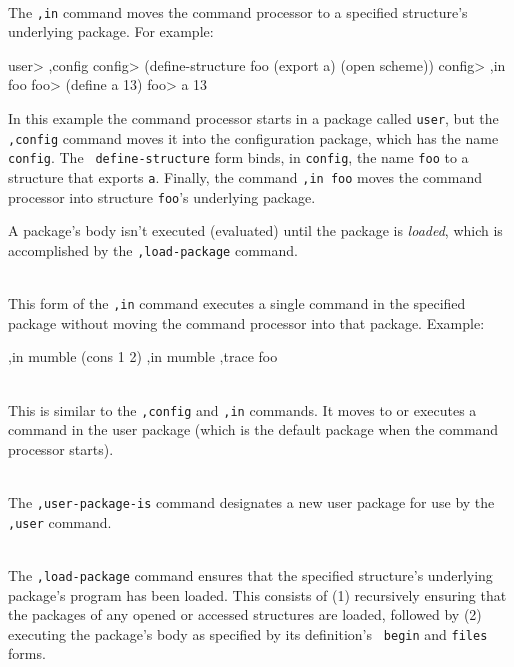 \begin{description}
\item {} \\
    The {\tt ,in} command moves the command processor to a specified
    structure's underlying package.  For example:
\begin{example}
user> ,config
config> (define-structure foo (export a)
          (open scheme))
config> ,in foo
foo> (define a 13)
foo> a
13
\end{example}
    In this example the command processor starts in a package called
    {\tt user}, but the {\tt ,config} command moves it into the
    configuration package, which has the name {\tt config}.  The {\tt
    define-structure} form binds, in {\tt config}, the name {\tt foo} to
    a structure that exports {\tt a}.  Finally, the command {\tt ,in
    foo} moves the command processor into structure {\tt foo}'s
    underlying package.

    A package's body isn't executed (evaluated) until the package is
    {\em loaded}, which is accomplished by the {\tt ,load-package}
    command.

\item {} \\
    This form of the {\tt,in} command executes a single command in the
    specified package without moving the command processor into that
    package.  Example:
\begin{example}
,in mumble (cons 1 2)
,in mumble ,trace foo
\end{example}

\item {} \\
    This is similar to the {\tt ,config} and {\tt ,in} commands.  It
    moves to or executes a command in the user package (which is the
    default package when the \hack{} command processor starts).

\item {} \\
    The {\tt,user-package-is} command designates a new user
    package for use by the {\tt,user} command.

\item {} \\
    The {\tt,load-package} command ensures that the specified structure's
    underlying package's program has been loaded.  This 
    consists of (1) recursively ensuring that the packages of any
    opened or accessed structures are loaded, followed by (2)
    executing the package's body as specified by its definition's {\tt
    begin} and {\tt files} forms.


\end{description}

